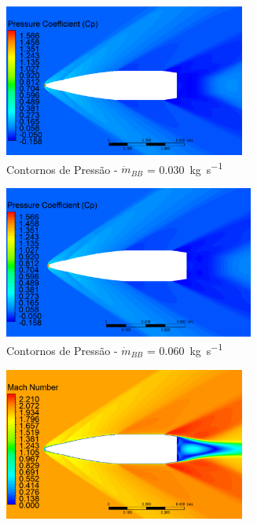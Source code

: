 \begin{figure}[!ht]
	\centering
	\begin{subfigure}[b]{0.47\textwidth} %
        \centering
        \includegraphics[height=5cm,width=\textwidth]{contorno-pressao-2306K-vazao-0030-2pol.png}
        \caption{Contornos de Pressão - \(\Dot{m}_{BB}\) = \qty{0,030}{\kilogram\per\second}}
        \label{fig:contorno-pressao-bb-2pol-vazao0030}
    \end{subfigure}
    \hfill
    \begin{subfigure}[b]{0.47\textwidth} %
        \centering
        \includegraphics[height=5cm,width=\textwidth]{contorno-pressao-2306K-vazao-0060-2pol.png}
        \caption{Contornos de Pressão - \(\Dot{m}_{BB}\) = \qty{0,060}{\kilogram\per\second}}
        \label{fig:contorno-pressao-bb-2pol-vazao0060}
    \end{subfigure}
    \hfill
    \begin{subfigure}[b]{0.47\textwidth} %
        \centering
        \includegraphics[height=5cm,width=\textwidth]{contorno-velocidade-2306K-vazao-0030-2pol.png}

\end{subfigure}
\end{figure}
